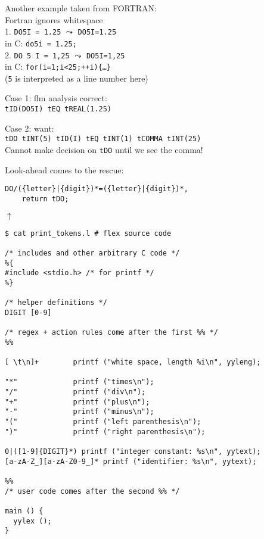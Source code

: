 \begin{slide*}
Another example taken from FORTRAN:\\
Fortran ignores whitespace\\[2ex]

1. {\tt DO5I = 1.25} $\leadsto$ {\tt DO5I=1.25} \\
\hspace*{5mm}in C: {\tt do5i = 1.25;}\\[1.5ex]
2. {\tt DO 5 I = 1,25} $\leadsto$ {\tt DO5I=1,25}\\
\hspace*{5mm}in C: {\tt for(i=1;i<25;++i)\{\ldots\}}\\
\hspace*{5mm}({\tt 5} is interpreted as a line number here)

Case 1: flm analysis correct:\\
{\footnotesize\tt tID(DO5I) tEQ tREAL(1.25)}

Case 2: want:\\
{\footnotesize\tt tDO tINT(5) tID(I) tEQ tINT(1) tCOMMA tINT(25)}\\[2ex]

Cannot make decision on {\tt tDO} until we see the comma!

Look-ahead comes to the rescue:

{\footnotesize
\begin{verbatim}
DO/({letter}|{digit})*=({letter}|{digit})*,
    return tDO; 
\end{verbatim}
{
\vspace{-7mm}
\hspace*{6.25cm}$\uparrow$
}
}

\vfil
\end{slide*}

\begin{slide*}
\begin{scriptsize}
\begin{verbatim}
$ cat print_tokens.l # flex source code

/* includes and other arbitrary C code */
%{
#include <stdio.h> /* for printf */
%}

/* helper definitions */
DIGIT [0-9]

/* regex + action rules come after the first %% */
%%

[ \t\n]+        printf ("white space, length %i\n", yyleng);
 
"*"             printf ("times\n");
"/"             printf ("div\n");
"+"             printf ("plus\n");
"-"             printf ("minus\n");
"("             printf ("left parenthesis\n");
")"             printf ("right parenthesis\n");
 
0|([1-9]{DIGIT}*) printf ("integer constant: %s\n", yytext);
[a-zA-Z_][a-zA-Z0-9_]* printf ("identifier: %s\n", yytext);

%%
/* user code comes after the second %% */

main () {
  yylex ();
}
\end{verbatim}
\end{scriptsize}

\vfil
\end{slide*}

